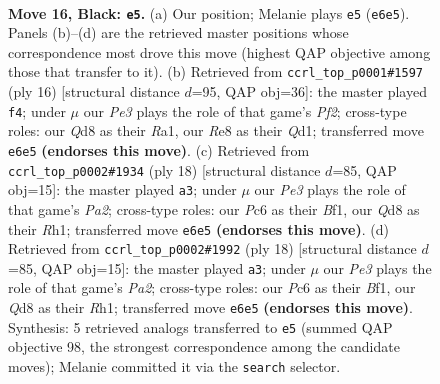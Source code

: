 \documentclass[11pt]{article}
\begin{document}
\begin{figure}[p]
\label{fig:thought-m29}
\end{figure}

\clearpage

\begin{figure}[p]\centering
\begin{subfigure}{0.46\textwidth}\centering
\resizebox{\linewidth}{!}{%
\newchessgame
\chessboard[
  setfen={rnbqr1k1/p3b2p/2p1ppp1/1p1n4/3P3P/1P1Q1BP1/P2NPPK1/RNB2R2 b - - 0 16},
  showmover=false,
  pgfstyle=straightmove, color=movearrow, markmove={e6-e5}
]}
\caption{}
\end{subfigure}\hfill
\begin{subfigure}{0.46\textwidth}\centering
\resizebox{\linewidth}{!}{%
\newchessgame
\chessboard[
  setfen={r1bq1rk1/ppp1npbp/2np2p1/8/2PNP3/2N1B1P1/PP3P1P/R2QKB1R w KQ - 3 9},
  showmover=false,
  pgfstyle=straightmove, color=movearrow, markmove={f2-f4}
]}
\caption{}
\end{subfigure}
\\[4pt]
\begin{subfigure}{0.46\textwidth}\centering
\resizebox{\linewidth}{!}{%
\newchessgame
\chessboard[
  setfen={r1b1kb1r/1pqn1ppp/p2ppn2/6B1/4PP2/1NN5/PPP1Q1PP/R3KB1R w KQkq - 5 10},
  showmover=false,
  pgfstyle=straightmove, color=movearrow, markmove={a2-a3}
]}
\caption{}
\end{subfigure}\hfill
\begin{subfigure}{0.46\textwidth}\centering
\resizebox{\linewidth}{!}{%
\newchessgame
\chessboard[
  setfen={r1b1kb1r/1pqn1ppp/p2ppn2/6B1/4PP2/1NN5/PPP1Q1PP/R3KB1R w KQkq - 5 10},
  showmover=false,
  pgfstyle=straightmove, color=movearrow, markmove={a2-a3}
]}
\caption{}
\end{subfigure}
\caption{\textbf{Move 16, Black: \texttt{e5}.} (a) Our position; Melanie plays \texttt{e5} (\texttt{e6e5}). Panels (b)--(d) are the retrieved master positions whose correspondence most drove this move (highest QAP objective among those that transfer to it). (b) Retrieved from \texttt{ccrl\_top\_p0001\#1597} (ply 16) [structural distance $d$=95, QAP obj=36]: the master played \texttt{f4}; under $\mu$ our \emph{Pe3} plays the role of that game's \emph{Pf2}; cross-type roles: our \emph{Q}d8 as their \emph{R}a1, our \emph{R}e8 as their \emph{Q}d1; transferred move \texttt{e6e5} \textbf{(endorses this move)}. (c) Retrieved from \texttt{ccrl\_top\_p0002\#1934} (ply 18) [structural distance $d$=85, QAP obj=15]: the master played \texttt{a3}; under $\mu$ our \emph{Pe3} plays the role of that game's \emph{Pa2}; cross-type roles: our \emph{P}c6 as their \emph{B}f1, our \emph{Q}d8 as their \emph{R}h1; transferred move \texttt{e6e5} \textbf{(endorses this move)}. (d) Retrieved from \texttt{ccrl\_top\_p0002\#1992} (ply 18) [structural distance $d$=85, QAP obj=15]: the master played \texttt{a3}; under $\mu$ our \emph{Pe3} plays the role of that game's \emph{Pa2}; cross-type roles: our \emph{P}c6 as their \emph{B}f1, our \emph{Q}d8 as their \emph{R}h1; transferred move \texttt{e6e5} \textbf{(endorses this move)}. Synthesis: 5 retrieved analogs transferred to \texttt{e5} (summed QAP objective 98, the strongest correspondence among the candidate moves); Melanie committed it via the \texttt{search} selector.}

\end{figure}
\end{document}
